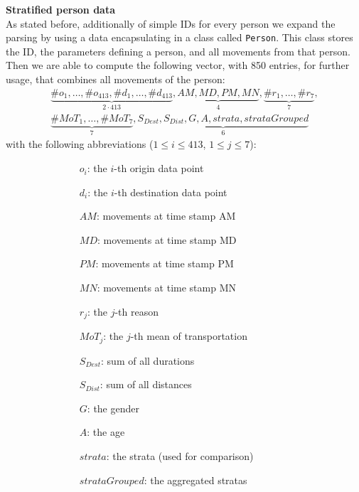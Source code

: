	\textbf{Stratified person data}\label{subsubsec: person vector data}\\
	As stated before, additionally of simple IDs for every person we expand the parsing by using a data encapsulating in a class called \texttt{Person}. This class stores the ID, the parameters defining a person, and all movements from that person.\\
	Then we are able to compute the following vector, with 850 entries, for further usage, that combines all movements of the person:
	\begin{align*}
	\underbrace{\#o_1, \dots, \#o_{413}, \#d_1, \dots, \#d_{413}}_{2\cdot 413} ,
	\underbrace{\mathit{AM}, \mathit{MD}, \mathit{PM}, \mathit{MN}}_{4}, 
	\underbrace{\#r_1, \dots, \#r_7}_{7}, \\
	\underbrace{\#\mathit{MoT}_1, \dots, \#\mathit{MoT}_7}_{7}, \underbrace{\mathit{S_{Dest}}, \mathit{S_{Dist}}, \mathit{G}, \mathit{A} ,\mathit{strata}, \mathit{strataGrouped}}_{6}
	\end{align*}
	with the following abbreviations ($1 \le i \le 413$, $1 \le j \le 7$):
	\begin{figure}[H]
		\centering
		\hspace*{-.3cm}
		\begin{subfigure}{0.50\textwidth}
		\begin{itemize}
			\setlength{\itemindent}{.4cm}
			\item[$o_i$:]  the $i$-th origin data point
			\item[$d_i$:]  the $i$-th destination data point
			\item[$\mathit{AM}$:] movements at time stamp AM
			\item[$\mathit{MD}$:] movements at time stamp MD
			\item[$\mathit{PM}$:] movements at time stamp PM
			\item[$\mathit{MN}$:] movements at time stamp MN
			\item[$r_j$:] the $j$-th reason
		\end{itemize}
	\end{subfigure}\hspace*{1cm}
	\begin{subfigure}{0.48\textwidth}
	\begin{itemize}
			\item[$\mathit{MoT}_j$:] the $j$-th mean of transportation
			\item[$\mathit{S_{Dest}}$:] sum of all durations
			\item[$\mathit{S_{Dist}}$:] sum of all distances
			\item[$\mathit{G}$:] the gender
			\item[$\mathit{A}$:] the age
			\item[$strata$:] the strata (used for comparison)
			\item[$strataGrouped$:] the aggregated stratas
		\end{itemize}
	\end{subfigure}
	\end{figure}


